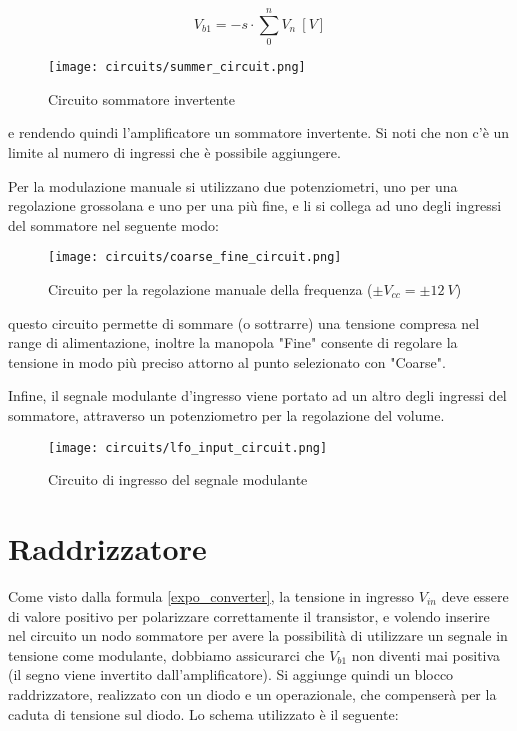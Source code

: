 \begin{equation}
    V_{b1}=-s\cdot\sum_0^n{V_{n}}\ [V]
\end{equation}

\begin{figure}[H]
    \centering
    \texttt{[image: circuits/summer\_circuit.png]}
    \caption{Circuito sommatore invertente}
    \label{summer_circuit}
\end{figure}

e rendendo quindi l'amplificatore un sommatore invertente. Si noti che non c'è un limite al
numero di ingressi che è possibile aggiungere.

Per la modulazione manuale si utilizzano due potenziometri, uno per una regolazione grossolana
e uno per una più fine, e li si collega ad uno degli ingressi del sommatore nel seguente modo:

\begin{figure}[H]
    \centering
    \texttt{[image: circuits/coarse\_fine\_circuit.png]}
    \caption{Circuito per la regolazione manuale della frequenza ($\pm V_{cc}=\pm12\ V$)}
    \label{coarse_fine_circuit}
\end{figure}

questo circuito permette di sommare (o sottrarre) una tensione compresa nel range di
alimentazione, inoltre la manopola "Fine" consente di regolare la tensione in modo più
preciso attorno al punto selezionato con "Coarse".

Infine, il segnale modulante d'ingresso viene portato ad un altro degli ingressi del sommatore,
attraverso un potenziometro per la regolazione del volume.

\begin{figure}[H]
    \centering
    \texttt{[image: circuits/lfo\_input\_circuit.png]}
    \caption{Circuito di ingresso del segnale modulante}
    \label{lfo_input_circuit}
\end{figure}


\section{Raddrizzatore}


Come visto dalla formula \ref{expo_converter}, la tensione in ingresso $V_{in}$ deve essere di
valore positivo per polarizzare correttamente il transistor, e volendo inserire nel circuito
un nodo sommatore per avere la possibilità di utilizzare un segnale in tensione come modulante,
dobbiamo assicurarci che $V_{b1}$ non diventi mai positiva (il segno viene invertito
dall'amplificatore). Si aggiunge quindi un blocco raddrizzatore, realizzato con un diodo e
un operazionale, che compenserà per la caduta di tensione sul diodo. Lo schema utilizzato
è il seguente:

